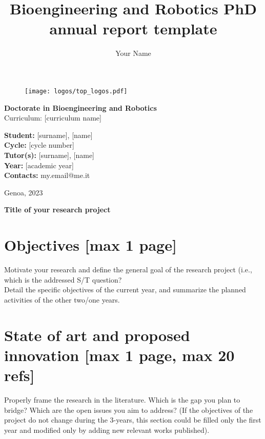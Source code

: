 \documentclass[11pt,a4paper]{article}
\author{Your Name}
\title{Bioengineering and Robotics PhD annual report template}
\begin{document}
\begin{figure}[t]
	\centering
	\texttt{[image: logos/top\_logos.pdf]}
\end{figure}
\hphantom{h}\vspace{1.3cm}


\begin{center}
	
\LARGE{\textbf{Doctorate in Bioengineering and Robotics }\vspace{0.4cm}\\
Curriculum: [curriculum name]}

\end{center}

\begin{flushleft}
\vspace{1.5cm}
\large{\textbf{Student: }}\large{{[surname], [name]}}\vspace{0.2cm}\\
\large{\textbf{Cycle: }}\large{[cycle number]}\vspace{0.2cm}\\
\large{\textbf{Tutor(s): }}\large{{[surname], [name]}}\vspace{0.2cm}\\
\large{\textbf{Year: }}\large{[academic year]}\vspace{0.2cm}\\
\large{\textbf{Contacts: }}\large{{my.email@me.it}}
\end{flushleft}

\vfill
\begin{center}
    {\large Genoa, 2023}
\end{center}

\clearpage
    \begin{center}
    \begin{large}
    \textbf{Title of your research project}\\
    \end{large}
    \end{center}
\section{Objectives [max 1 page]}
Motivate your research and define the general goal of the research project (i.e., which is the addressed S/T question? \\
Detail the specific objectives of the current year, and summarize the planned activities of the other two/one years.  

\section{State of art and proposed innovation [max 1 page, max 20 refs]} 
Properly frame the research in the literature. Which is the gap you plan to bridge? Which are the open issues you aim to address? 
(If the objectives of the project do not change during the 3-years, this section could be filled only the first year and modified only by adding new relevant works published). 
\end{document}
